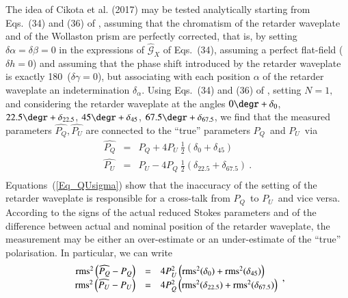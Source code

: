 \documentclass[a4paper]{aa}
\newcommand{\pq}{\ensuremath{P_Q}}
\newcommand{\pu}{\ensuremath{P_U}}
\begin{document}
The idea of Cikota et al. (2017) may be tested analytically starting
from Eqs.~(34) and (36) of \citet{Bagetal09}, assuming that the
chromatism of the retarder waveplate and of the Wollaston prism are
perfectly corrected, that is, by setting $\delta \alpha = \delta \beta=0$ in
the expressions of $\widehat{\mathcal{G}}_X$ of Eqs.~(34), assuming a
perfect flat-field ($\delta h = 0$) and assuming
that the phase shift introduced by the retarder waveplate is exactly
180\degr\ ($\delta \gamma = 0$), but associating with each position
$\alpha$ of the retarder waveplate an indetermination $\delta_\alpha$.
Using Eqs.~(34) and (36) of \citet{Bagetal09}, setting $N=1,$ and considering
  the retarder waveplate at the angles
$0\degr + \delta_{0}$,
$22.5\degr + \delta_{22.5}$,
$45\degr + \delta_{45}$,
$67.5\degr + \delta_{67.5}$,
we find that the measured parameters
$\widehat{\pq}, \widehat{\pu}$ are connected to the ``true''
parameters \pq\ and \pu\ via
\begin{equation}
  \begin{array}{rcl}
    \widehat{\pq} &=& \pq + 4\pu\ \frac{1}{2}\left(\delta_{0}  +\delta_{45}\right)\\
    \widehat{\pu} &=& \pu - 4\pq\ \frac{1}{2}\left(\delta_{22.5}+\delta_{67.5}\right) \ . \\ 
\end{array}
\label{Eq_QUsigma}
\end{equation}
Equations~(\ref{Eq_QUsigma}) show that the inaccuracy of the
setting of the retarder waveplate is responsible for a cross-talk
from \pq\ to \pu\ and vice versa. According to the signs of the actual reduced
Stokes parameters and of the difference between actual and nominal
position of the retarder waveplate, the measurement may be either
an over-estimate or an under-estimate of the ``true'' polarisation. In particular, we can write
\begin{equation}
  \begin{array}{rcl}
{\rm rms}^2\left(\widehat{\pq}-\pq\right) &=& 4 \pu^2 \left({\rm rms}^2(\delta_{0})  +{\rm rms}^2(\delta_{45})\right)\\
{\rm rms}^2\left(\widehat{\pu}-\pu\right) &=& 4 \pq^2 \left({\rm rms}^2(\delta_{22.5})+{\rm rms}^2(\delta_{67.5})\right)\\
  \end{array}
,\end{equation}
\end{document}
